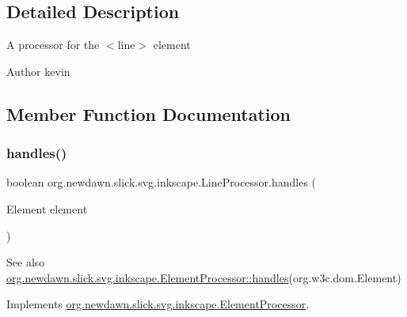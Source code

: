 \subsection{Detailed Description}
A processor for the $<$line$>$ element

\begin{DoxyAuthor}{Author}
kevin 
\end{DoxyAuthor}


\subsection{Member Function Documentation}
\mbox{\label{classorg_1_1newdawn_1_1slick_1_1svg_1_1inkscape_1_1_line_processor_ae2f55b553c23eb5a3bab9d194ce2b4bb}} 
\subsubsection{\texorpdfstring{handles()}{handles()}}
{\footnotesize\ttfamily boolean org.\+newdawn.\+slick.\+svg.\+inkscape.\+Line\+Processor.\+handles (\begin{DoxyParamCaption}\item[{Element}]{element }\end{DoxyParamCaption})\hspace{0.3cm}{\ttfamily [inline]}}

\begin{DoxySeeAlso}{See also}
\mbox{\hyperlink{interfaceorg_1_1newdawn_1_1slick_1_1svg_1_1inkscape_1_1_element_processor_ae95bbf21a67c52aff02cf09259c554a3}{org.\+newdawn.\+slick.\+svg.\+inkscape.\+Element\+Processor\+::handles}}(org.\+w3c.\+dom.\+Element) 
\end{DoxySeeAlso}


Implements \mbox{\hyperlink{interfaceorg_1_1newdawn_1_1slick_1_1svg_1_1inkscape_1_1_element_processor_ae95bbf21a67c52aff02cf09259c554a3}{org.\+newdawn.\+slick.\+svg.\+inkscape.\+Element\+Processor}}.


